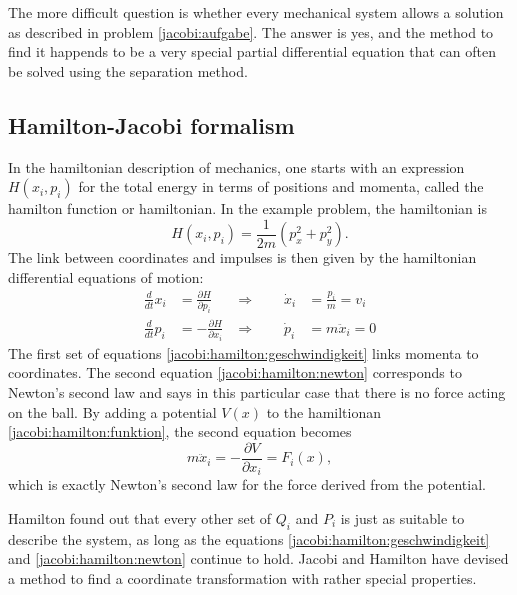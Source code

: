 The more difficult question is whether every mechanical system
allows a solution as described in problem \ref{jacobi:aufgabe}.
The answer is yes, and the method to find it happends to
be a very special partial differential equation that can often
be solved using the separation method.

\subsection{Hamilton-Jacobi formalism}
In the hamiltonian description of mechanics, one starts with an
expression $H(x_i, p_i)$ for the total energy in terms of positions
and momenta, called the hamilton function or hamiltonian.
In the example problem, the hamiltonian is
\begin{equation}
H(x_i,p_i)=\frac1{2m}(p_x^2+p_y^2).
\label{jacobi:hamilton:funktion}
\end{equation}
The link between coordinates and impulses is then given by the
hamiltonian differential equations of motion:
\begin{align}
\frac{d}{dt}x_i&=\frac{\partial H}{\partial p_i}
&\Rightarrow
\qquad \dot x_i&=\frac{p_i}{m}=v_i
\label{jacobi:hamilton:geschwindigkeit}
\\
\frac{d}{dt}p_i&=-\frac{\partial H}{\partial x_i}
&\Rightarrow
\qquad
\dot p_i&=m\ddot x_i=0
\label{jacobi:hamilton:newton}
\end{align}
The first set of equations
\eqref{jacobi:hamilton:geschwindigkeit}
links momenta to coordinates.
The second equation \eqref{jacobi:hamilton:newton} corresponds to
Newton's second law and says in this particular case that there
is no force acting on the ball.
By adding a potential $V(x)$ to the hamiltionan
\eqref{jacobi:hamilton:funktion}, the second equation becomes
\[
m\ddot x_i=-\frac{\partial V}{\partial x_i} = F_i(x),
\]
which is exactly Newton's second law for the force derived from 
the potential.

Hamilton found out that every other set of $Q_i$ and $P_i$ is just as
suitable to describe the system, as long as the equations
\eqref{jacobi:hamilton:geschwindigkeit} and \eqref{jacobi:hamilton:newton}
continue to hold.
Jacobi and Hamilton have devised a method to find a coordinate
transformation with rather special properties.

